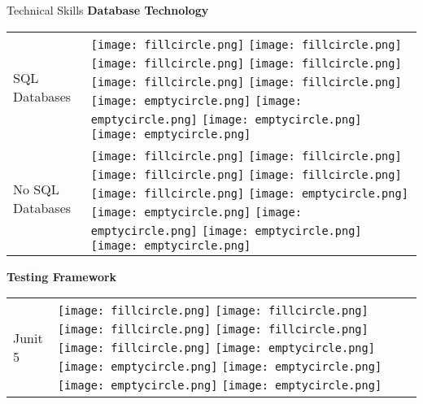 \documentclass{resume}
\begin{document}
\begin{rSection}{Technical Skills}
{\bf Database Technology}
\begin{table}[h!]
  \begin{tabular}{p{10cm}p{6cm}}
 SQL Databases & 
 \texttt{[image: fillcircle.png]} 
 \texttt{[image: fillcircle.png]} 
 \texttt{[image: fillcircle.png]}
 \texttt{[image: fillcircle.png]} 
 \texttt{[image: fillcircle.png]}
 \texttt{[image: fillcircle.png]} 
 \texttt{[image: emptycircle.png]}
 \texttt{[image: emptycircle.png]} 
 \texttt{[image: emptycircle.png]} 
 \texttt{[image: emptycircle.png]} \\
 No SQL Databases & 
 \texttt{[image: fillcircle.png]} 
 \texttt{[image: fillcircle.png]} 
 \texttt{[image: fillcircle.png]}
 \texttt{[image: fillcircle.png]} 
 \texttt{[image: fillcircle.png]}
 \texttt{[image: emptycircle.png]} 
 \texttt{[image: emptycircle.png]}
 \texttt{[image: emptycircle.png]} 
 \texttt{[image: emptycircle.png]} 
 \texttt{[image: emptycircle.png]} \\
 \end{tabular}
\end{table}

{\bf Testing Framework}
\begin{table}[h!]
  \begin{tabular}{p{10cm}p{6cm}}
  Junit 5 & 
  \texttt{[image: fillcircle.png]} 
  \texttt{[image: fillcircle.png]} 
  \texttt{[image: fillcircle.png]}
  \texttt{[image: fillcircle.png]} 
  \texttt{[image: fillcircle.png]}
  \texttt{[image: emptycircle.png]} 
  \texttt{[image: emptycircle.png]}
  \texttt{[image: emptycircle.png]} 
  \texttt{[image: emptycircle.png]} 
  \texttt{[image: emptycircle.png]} \\
  \end{tabular}
\end{table}


\end{rSection}
\end{document}
